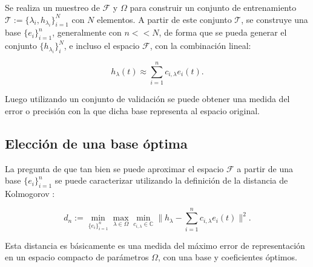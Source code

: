 Se realiza un muestreo de $\mathcal{F}$ y $\Omega$ para construir un conjunto de entrenamiento $\mathcal{T} := \{\lambda_i, h_{\lambda_i}\}_{i=1}^N$ con $N$ elementos. A partir de este conjunto $\mathcal{T}$, se construye una base $\{e_i\}_{i=1}^n$, generalmente con $n << N$, de forma que se pueda generar el conjunto $\{h_{\lambda_i}\}_i^N$, e incluso el espacio $\mathcal{F}$, con la combinación lineal:


\begin{equation}
\label{eq:rb0}
h_{\lambda} (t) \approx \sum_{i=1}^{n} c_{i,\lambda} e_i(t).
\end{equation}

Luego utilizando un conjunto de validación se puede obtener una medida del error o precisión con la que dicha base representa al espacio original.

\subsection{Elección de una base óptima}

La pregunta de que tan bien se puede aproximar el espacio $\mathcal{F}$ a partir de una base $\{e_i\}_{i=1}^n$ se puede caracterizar utilizando la definición de la distancia de Kolmogorov \cite{Pinkus1985nWidthsIA}:

\begin{equation} \label{eq:kolmogorov}
d_n := \min_{\{e_i\}_{i=1}^n} \max_{\lambda \in \Omega} \min_{ c_{i,\lambda} \in \mathbb{C}} \| h_{\lambda} - \sum_{i=1}^{n} c_{i,\lambda} e_i(t)\|^2.
\end{equation}



Esta distancia es básicamente es una medida del máximo error de representación en un espacio compacto de parámetros $\Omega$, con una base y coeficientes óptimos.

